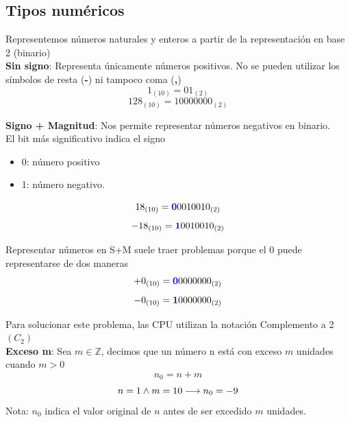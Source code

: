 \documentclass[10pt,a4paper]{article}
\begin{document}
\subsection*{Tipos numéricos}
Representemos números naturales y enteros a partir de la representación en base 2 (binario) \\

\textbf{Sin signo}: Representa únicamente números positivos. No se pueden utilizar los símbolos de resta (\textbf{-}) ni tampoco coma (\textbf{,})
\[1_{(10)} = 01_{(2)}\]
\[128_{(10)} = 1000 0000_{(2)}\]

\textbf{Signo + Magnitud}: Nos permite representar números negativos en binario. \\ El bit más significativo indica el signo
\begin{itemize}
    \item 0: número positivo
    \item 1: número negativo.
\end{itemize}

\[18_{(10)} = \textcolor{blue}{\textbf{0}}0010010_{(2)}\]
\[-18_{(10)} = \textcolor{blue}{\textbf{1}}0010010_{(2)}\]

Representar números en S+M suele traer problemas porque el 0 puede representarse de dos maneras
\[+0_{(10)} = \textcolor{blue}{\textbf{0}}0000000_{(2)}\]
\[-0_{(10)} = \textcolor{blue}{\textbf{1}}0000000_{(2)}\]

Para solucionar este problema, las CPU utilizan la notación Complemento a 2 \((C_{2})\) \\

\textbf{Exceso m}: Sea \( m \in \mathbb{Z} \), decimos que un número n está con exceso \(m\) unidades cuando \(m>0\) 
\[n_{0}=n+m\]
\[n=1 \land m=10 \longrightarrow n_{0}=-9 \]
Nota: \(n_{0}\) indica el valor original de \(n\)  antes de ser excedido \(m\) unidades.  \\
\end{document}
